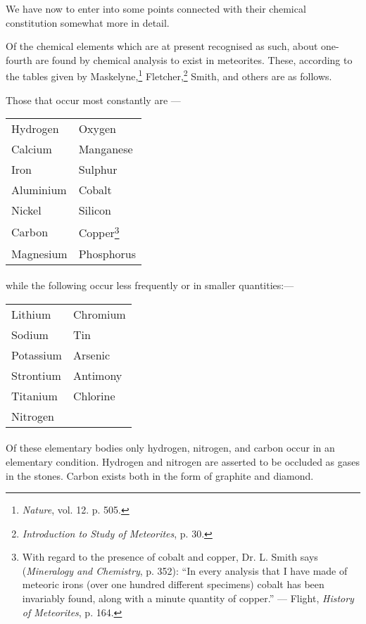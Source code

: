 \documentclass[a4paper, 12pt, oneside, polutonikogreek, english]{article}
\begin{document}
We have now to enter into some points connected with their chemical constitution somewhat more in detail.

Of the chemical elements which are at present recognised as such, about one-fourth are found by chemical analysis to exist in meteorites. These, according to the tables given by Maskelyne,\footnote{\emph{Nature}, vol. 12. p. 505.} Fletcher,\footnote{\emph{Introduction to Study of Meteorites}, p. 30.} Smith, and others are as follows.

Those that occur most constantly are ---
\begin{table}[H]
    \centering
    \begin{tabular}{l l}
        Hydrogen  & Oxygen  \\ 
        Calcium  & Manganese  \\ 
        Iron  & Sulphur  \\ 
        Aluminium  & Cobalt  \\ 
        Nickel  & Silicon  \\ 
        Carbon  & Copper\footnote{With regard to the presence of cobalt and copper, Dr. L. Smith says (\emph{Mineralogy and Chemistry}, p. 352): ``In every analysis that I have made of meteoric irons (over one hundred different specimens) cobalt has been invariably found, along with a minute quantity of copper.'' --- Flight, \emph{History of Meteorites}, p. 164.}  \\ 
        Magnesium  & Phosphorus \\ 
    \end{tabular}
\end{table}
\paragraph{}
while the following occur less frequently or in smaller quantities:---
\begin{table}[H]
    \centering
    \begin{tabular}{l l}
        Lithium & Chromium \\ 
        Sodium & Tin \\ 
        Potassium & Arsenic \\ 
        Strontium & Antimony \\ 
        Titanium & Chlorine \\ 
        Nitrogen & ~ \\ 
    \end{tabular}
\end{table}
\paragraph{}
Of these elementary bodies only hydrogen, nitrogen, and carbon occur in an elementary condition. Hydrogen and nitrogen are asserted to be occluded as gases in the stones. Carbon exists both in the form of graphite and diamond.
\end{document}
